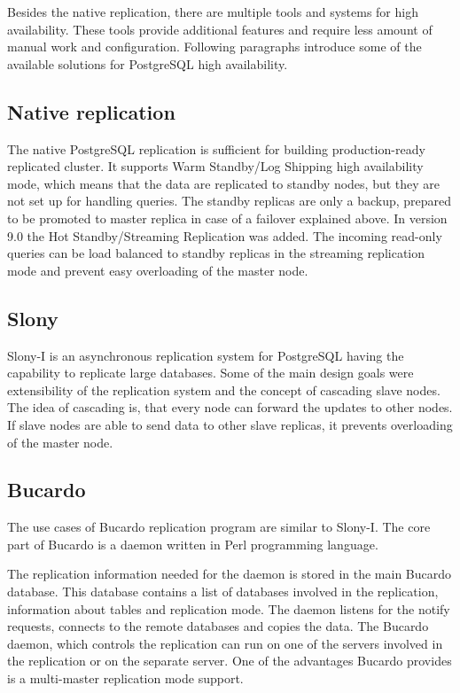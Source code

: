 \documentclass[
  digital, %
  twoside, %
  table,   %
  nolof,   %
  nolot,   %
]{fithesis3}
\begin{document}
Besides the native replication, there are multiple tools and systems for high availability. These tools provide additional features and require less amount of manual work and configuration. Following paragraphs introduce some of the available solutions for PostgreSQL high availability.

\subsection{Native replication}
The native PostgreSQL replication is sufficient for building production-ready replicated cluster. It supports Warm Standby/Log Shipping high availability mode, which means that the data are replicated to standby nodes, but they are not set up for handling queries. The standby replicas are only a backup, prepared to be promoted to master replica in case of a failover explained above. In version 9.0 the Hot Standby/Streaming Replication was added. The incoming read-only queries can be load balanced to standby replicas in the streaming replication mode and prevent easy overloading of the master node.

\subsection{Slony}
Slony-I \cite{slony} is an asynchronous replication system for PostgreSQL having the capability to replicate large databases. Some of the main design goals were extensibility of the replication system and the concept of cascading slave nodes. The idea of cascading is, that every node can forward the updates to other nodes. If slave nodes are able to send data to other slave replicas, it prevents overloading of the master node.

\subsection{Bucardo}
The use cases of Bucardo \cite{bucardo} replication program are similar to Slony-I. The core part of Bucardo is a daemon written in Perl \cite{perl} programming language.

The replication information needed for the daemon is stored in the main Bucardo database. This database contains a list of databases involved in the replication, information about tables and replication mode. The daemon listens for the notify requests, connects to the remote databases and copies the data. The Bucardo daemon, which controls the replication can run on one of the servers involved in the replication or on the separate server. One of the advantages Bucardo provides is a multi-master replication mode support.
\end{document}
